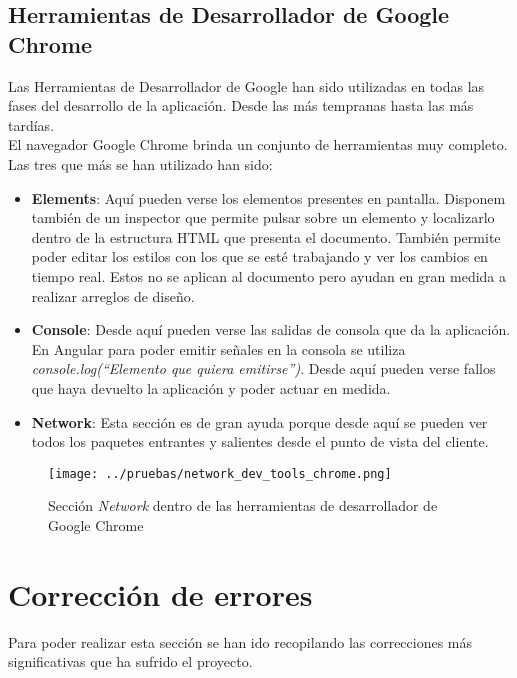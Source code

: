 \subsection{Herramientas de Desarrollador de Google Chrome}
Las Herramientas de Desarrollador de Google han sido utilizadas en todas las fases del desarrollo de la aplicación. Desde las más tempranas hasta las más tardías.
\\El navegador Google Chrome brinda un conjunto de herramientas muy completo. Las tres que más se han utilizado han sido:
\begin{itemize}
    \item \textbf{Elements}: Aquí pueden verse los elementos presentes en pantalla. Disponem también de un inspector que permite pulsar sobre un elemento y localizarlo dentro de la estructura HTML que presenta el documento. También permite poder editar los estilos con los que se esté trabajando y ver los cambios en tiempo real. Estos no se aplican al documento pero ayudan en gran medida a realizar arreglos de diseño.
    \item \textbf{Console}: Desde aquí pueden verse las salidas de consola que da la aplicación. En Angular para poder emitir señales en la consola se utiliza \textit{console.log(``Elemento que quiera emitirse'')}. Desde aquí pueden verse fallos que haya devuelto la aplicación y poder actuar en medida.
    \item \textbf{Network}: Esta sección es de gran ayuda porque desde aquí se pueden ver todos los paquetes entrantes y salientes desde el punto de vista del cliente.
\end{itemize}
\begin{figure}[h]
    \centering
    \texttt{[image: ../pruebas/network\_dev\_tools\_chrome.png]}
    \caption{Sección \textit{Network} dentro de las herramientas de desarrollador de Google Chrome}
\end{figure}
\section{Corrección de errores}
Para poder realizar esta sección se han ido recopilando las correcciones más significativas que ha sufrido el proyecto.

